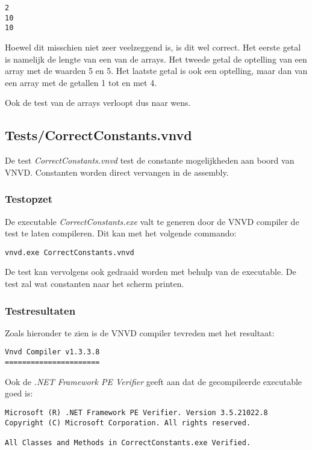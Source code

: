 \begin{lstlisting}
2
10
10
\end{lstlisting}

Hoewel dit misschien niet zeer veelzeggend is, is dit wel correct. Het eerste getal is namelijk de lengte van een van de arrays. Het tweede getal de optelling van een array met de waarden 5 en 5. Het laatste getal is ook een optelling, maar dan van een array met de getallen 1 tot en met 4.

Ook de test van de arrays verloopt dus naar wens.

\subsection{Tests/CorrectConstants.vnvd}
De test \textit{CorrectConstants.vnvd} test de constante mogelijkheden aan boord van VNVD. Constanten worden direct vervangen in de assembly.

\subsubsection{Testopzet}
De executable \textit{CorrectConstants.exe} valt te generen door de VNVD compiler de test te laten compileren. Dit kan met het volgende commando:

\begin{lstlisting}
vnvd.exe CorrectConstants.vnvd
\end{lstlisting}

De test kan vervolgens ook gedraaid worden met behulp van de executable. De test zal wat constanten naar het scherm printen.

\subsubsection{Testresultaten}
Zoals hieronder te zien is de VNVD compiler tevreden met het resultaat:

\begin{lstlisting}
Vnvd Compiler v1.3.3.8
======================

\end{lstlisting}

Ook de \textit{.NET Framework PE Verifier} geeft aan dat de gecompileerde executable goed is:

\begin{lstlisting}
Microsoft (R) .NET Framework PE Verifier. Version 3.5.21022.8
Copyright (C) Microsoft Corporation. All rights reserved.

All Classes and Methods in CorrectConstants.exe Verified.
\end{lstlisting}

